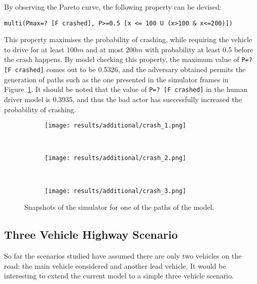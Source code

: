By observing the Pareto curve, the following property can be devised:

\begin{minipage}{\linewidth}
{\vspace{1em}
\begin{lstlisting}
multi(Pmax=? [F crashed], P>=0.5 [x <= 100 U (x>100 & x<=200)])
\end{lstlisting}
}
\end{minipage}

This property maximises the probability of crashing, while requiring the vehicle to drive for at least $100m$ and at most $200m$ with probability at least 0.5 before the crash happens. By model checking this property, the maximum value of \texttt{P=? [F crashed]} comes out to be 0.5326, and the adversary obtained permits the generation of paths such as the one presented in the simulator frames in Figure~\ref{fig:unsafe_sim}. It should be noted that the value of \texttt{P=? [F crashed]} in the human driver model is 0.3935, and thus the bad actor has successfully increased the probability of crashing. 

\vspace{1em}
\begin{figure}[H]
\centering
\begin{subfigure}{0.75\textwidth}
  \centering
  \texttt{[image: results/additional/crash\_1.png]}
\end{subfigure}\\ \vspace{2px}
\begin{subfigure}{0.75\textwidth}
  \centering
  \texttt{[image: results/additional/crash\_2.png]}
\end{subfigure} \\ \vspace{2px}
\begin{subfigure}{0.75\textwidth}
  \centering
  \texttt{[image: results/additional/crash\_3.png]}
\end{subfigure}
\caption{Snapshots of the simulator for one of the paths of the model.}
\label{fig:unsafe_sim}
\end{figure}

\subsection{Three Vehicle Highway Scenario}

So far the scenarios studied have assumed there are only two vehicles on the road: the main vehicle considered and another lead vehicle. It would be interesting to extend the current model to a simple three vehicle scenario. 

